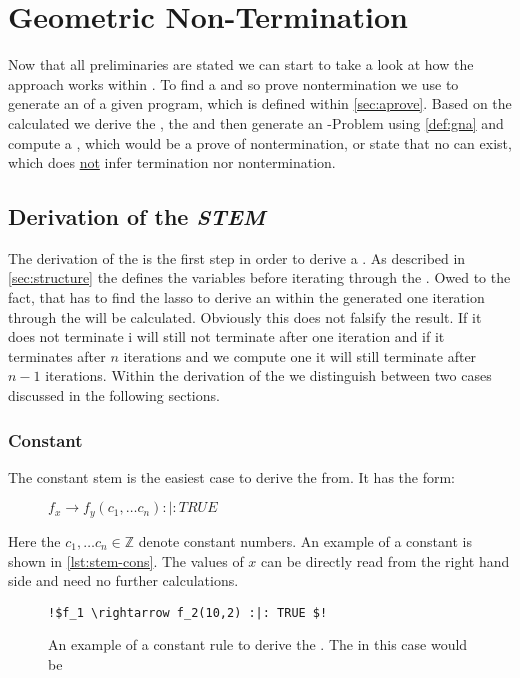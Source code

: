 \chapter{Geometric Non-Termination}
\label{chapter:geo-non-term}
Now that all preliminaries are stated we can start to take a look at how the approach works within \aprove. To find a \gna and so prove nontermination we use \aprove to generate an \its of a given program, which is defined within \autoref{sec:aprove}.
Based on the calculated \its we derive the \stem, the \loopt and then generate an -Problem using \autoref{def:gna} and compute a \gna, which would be a prove of nontermination, or state that no \gna can exist, which does \underline{not} infer termination nor nontermination.

\section{Derivation of the \emph{STEM}}
\label{sec:stem}
The derivation of the \stem is the first step in order to derive a \gna. As described in \autoref{sec:structure} the \stem defines the variables before iterating through the \loopt.  Owed to the fact, that \aprove has to find the lasso to derive an \its within the generated \seg one iteration through the \loopt will be calculated. Obviously this does not falsify the result. If it does not terminate i will still not terminate after one iteration and if it terminates after $n$ iterations and we compute one it will still terminate after $n-1$ iterations. \newline
Within the derivation of the \stem we distinguish between two cases discussed in the following sections.

\subsection{Constant \stem}
\label{sec:stem-const}
The constant stem is the easiest case to derive the \stem from. It has the form: 
\begin{figure}[H]
	\centering
	$f_x \rightarrow f_y(c_1,\dots c_n) :|: TRUE$
\end{figure} 
Here the $c_1,\dots c_n \in \mathbb{Z}$ denote constant numbers. \newline
An example of a constant \stem is shown in \autoref{lst:stem-cons}. 
The values of $x$ can be directly read from the right hand side and need no further calculations.
\newsavebox{\stemexone}%
\begin{figure}[H]
	\begin{lstlisting}[escapechar=!]
	!$f_1 \rightarrow f_2(10,2) :|: TRUE $!
	\end{lstlisting}	
	\caption{An example of a constant \its rule to derive the \stem. The \stem in this case would be \usebox{\stemexone} }
	\label{lst:stem-cons}
\end{figure}

